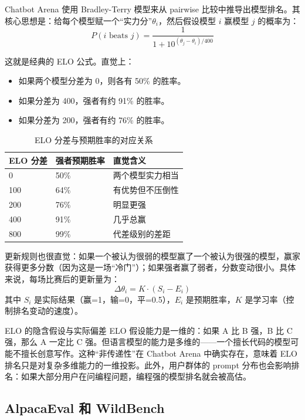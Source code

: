 \documentclass[a4paper]{article}
\begin{document}
Chatbot Arena 使用 Bradley-Terry 模型来从 pairwise 比较中推导出模型排名。其核心思想是：给每个模型赋一个``实力分''$\theta_i$，然后假设模型 $i$ 赢模型 $j$ 的概率为：
\[
P(i \text{ beats } j) = \frac{1}{1 + 10^{(\theta_j - \theta_i)/400}}
\]

这就是经典的 ELO 公式。直觉上：
\begin{itemize}
    \item 如果两个模型分差为 0，则各有 50\% 的胜率。
    \item 如果分差为 400，强者有约 91\% 的胜率。
    \item 如果分差为 200，强者有约 76\% 的胜率。
\end{itemize}

\begin{table}[H]
\centering
\begin{tabular}{p{3.0cm}p{4.0cm}p{5.5cm}}
\toprule
\textbf{ELO 分差} & \textbf{强者预期胜率} & \textbf{直觉含义} \\
\midrule
0 & 50\% & 两个模型实力相当 \\
100 & 64\% & 有优势但不压倒性 \\
200 & 76\% & 明显更强 \\
400 & 91\% & 几乎总赢 \\
800 & 99\% & 代差级别的差距 \\
\bottomrule
\end{tabular}
\caption{ELO 分差与预期胜率的对应关系}
\end{table}

更新规则也很直觉：如果一个被认为很弱的模型赢了一个被认为很强的模型，赢家获得更多分数（因为这是一场``冷门''）；如果强者赢了弱者，分数变动很小。具体来说，每场比赛后的更新量为：
\[
\Delta\theta_i = K \cdot (S_i - E_i)
\]
其中 $S_i$ 是实际结果（赢=1，输=0，平=0.5），$E_i$ 是预期胜率，$K$ 是学习率（控制排名变动的速度）。

\begin{warningbox}{ELO 的隐含假设与实际偏差}
ELO 假设能力是一维的：如果 A 比 B 强，B 比 C 强，那么 A 一定比 C 强。但语言模型的能力是多维的——一个擅长代码的模型可能不擅长创意写作。这种``非传递性''在 Chatbot Arena 中确实存在，意味着 ELO 排名只是对复杂多维能力的一维投影。此外，用户群体的 prompt 分布也会影响排名：如果大部分用户在问编程问题，编程强的模型排名就会被高估。
\end{warningbox}

\subsection{AlpacaEval 和 WildBench}
\end{document}
